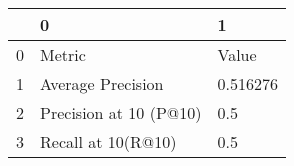 \begin{tabular}{lll}
\toprule
{} &                       0 &         1 \\
\midrule
0 &                  Metric &     Value \\
1 &       Average Precision &  0.516276 \\
2 &  Precision at 10 (P@10) &       0.5 \\
3 &      Recall at 10(R@10) &       0.5 \\
\bottomrule
\end{tabular}
